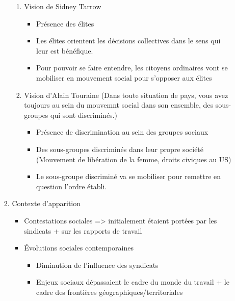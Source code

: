 \documentclass[11pt]{article}
\begin{document}
\begin{enumerate}
\begin{enumerate}
\begin{enumerate}
\begin{enumerate}
\item Vision de Sidney Tarrow
\label{sec:orgdde5f3e}
\begin{itemize}
\item Présence des élites
\item Les élites orientent les décisions collectives dans le sens qui leur est bénéfique.
\item Pour pouvoir se faire entendre, les citoyens ordinaires vont se mobiliser en
mouvement social pour s'opposer aux élites
\end{itemize}
\item Vision d'Alain Touraine
\label{sec:org744cfd5}
(Dans toute situation de pays, vous avez toujours au sein du mouvemnt social
dans son ensemble, des sous-groupes qui sont discriminés.)
\begin{itemize}
\item Présence de discrimination au sein des groupes sociaux
\item Des sous-groupes discriminés dans leur propre société (Mouvement de libération
de la femme, droits civiques au US)
\item Le sous-groupe discriminé va se mobiliser pour remettre en question l'ordre
établi.
\end{itemize}
\end{enumerate}
\item Contexte d'apparition
\label{sec:orgbea401f}
\begin{itemize}
\item Contestations sociales => initialement étaient portées par les sindicats +
sur les rapports de travail
\item Évolutions sociales contemporaines
\begin{itemize}
\item Diminution de l'influence des syndicats
\item Enjeux sociaux dépassaient le cadre du monde du travail + le cadre des frontières géographiques/territoriales
\end{itemize}
\end{itemize}


\end{enumerate}
\end{enumerate}
\end{enumerate}
\end{document}
